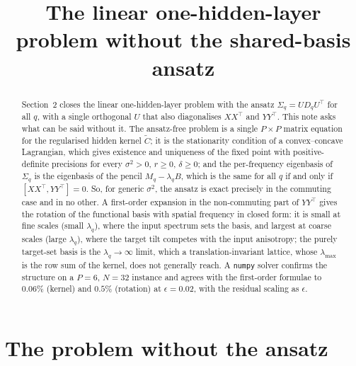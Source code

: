 \documentclass[11pt,a4paper]{article}
\title{The linear one-hidden-layer problem without the shared-basis ansatz}
\author{}
\date{}
\newcommand{\Ct}{\tilde C}
\begin{document}
\maketitle

\begin{abstract}
Section~2 closes the linear one-hidden-layer problem with the ansatz $\Sigma_q = U D_q U^\top$ for all $q$, with a single orthogonal $U$ that also diagonalises $XX^\top$ and $YY^\top$. This note asks what can be said without it. The ansatz-free problem is a single $P\times P$ matrix equation for the regularised hidden kernel $\Ct$; it is the stationarity condition of a convex--concave Lagrangian, which gives existence and uniqueness of the fixed point with positive-definite precisions for every $\sigma^2>0$, $r\ge0$, $\delta\ge0$; and the per-frequency eigenbasis of $\Sigma_q$ is the eigenbasis of the pencil $M_q - \lambda_q B$, which is the same for all $q$ if and only if $[XX^\top, YY^\top]=0$. So, for generic $\sigma^2$, the ansatz is exact precisely in the commuting case and in no other. A first-order expansion in the non-commuting part of $YY^\top$ gives the rotation of the functional basis with spatial frequency in closed form: it is small at fine scales (small $\lambda_q$), where the input spectrum sets the basis, and largest at coarse scales (large $\lambda_q$), where the target tilt competes with the input anisotropy; the purely target-set basis is the $\lambda_q\to\infty$ limit, which a translation-invariant lattice, whose $\lambda_{\max}$ is the row sum of the kernel, does not generally reach. A \texttt{numpy} solver confirms the structure on a $P=6$, $N=32$ instance and agrees with the first-order formulae to $0.06\%$ (kernel) and $0.5\%$ (rotation) at $\epsilon = 0.02$, with the residual scaling as $\epsilon$.
\end{abstract}

\section{The problem without the ansatz}
\label{sec:problem}
\end{document}
